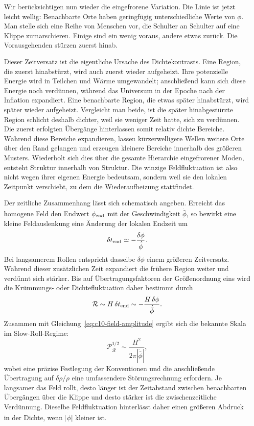 Wir berücksichtigen nun wieder die eingefrorene Variation. Die Linie ist jetzt leicht wellig: Benachbarte Orte haben geringfügig unterschiedliche Werte von \(\phi\). Man stelle sich eine Reihe von Menschen vor, die Schulter an Schulter auf eine Klippe zumarschieren. Einige sind ein wenig voraus, andere etwas zurück. Die Vorausgehenden stürzen zuerst hinab.

Dieser Zeitversatz ist die eigentliche Ursache des Dichtekontrasts. Eine Region, die zuerst hinabstürzt, wird auch zuerst wieder aufgeheizt. Ihre potenzielle Energie wird in Teilchen und Wärme umgewandelt; anschließend kann sich diese Energie noch verdünnen, während das Universum in der Epoche nach der Inflation expandiert. Eine benachbarte Region, die etwas später hinabstürzt, wird später wieder aufgeheizt. Vergleicht man beide, ist die später hinabgestürzte Region schlicht deshalb dichter, weil sie weniger Zeit hatte, sich zu verdünnen. Die zuerst erfolgten Übergänge hinterlassen somit relativ dichte Bereiche. Während diese Bereiche expandieren, lassen kürzerwelligere Wellen weitere Orte über den Rand gelangen und erzeugen kleinere Bereiche innerhalb des größeren Musters. Wiederholt sich dies über die gesamte Hierarchie eingefrorener Moden, entsteht Struktur innerhalb von Struktur. Die winzige Feldfluktuation ist also nicht wegen ihrer eigenen Energie bedeutsam, sondern weil sie den lokalen Zeitpunkt verschiebt, zu dem die Wiederaufheizung stattfindet.

Der zeitliche Zusammenhang lässt sich schematisch angeben. Erreicht das homogene Feld den Endwert \(\phi_{\rm end}\) mit der Geschwindigkeit \(\dot{\bar\phi}\), so bewirkt eine kleine Feldauslenkung eine Änderung der lokalen Endzeit um
\begin{equation}
\delta t_{\rm end}
\simeq-\frac{\delta\phi}{\dot{\bar\phi}}.
\label{eq:c10-time-delay}
\end{equation}
Bei langsamerem Rollen entspricht dasselbe \(\delta\phi\) einem größeren Zeitversatz. Während dieser zusätzlichen Zeit expandiert die frühere Region weiter und verdünnt sich stärker. Bis auf Übertragungsfaktoren der Größenordnung eins wird die Krümmungs- oder Dichtefluktuation daher bestimmt durch
\begin{equation}
\mathcal R
\sim H\,\delta t_{\rm end}
\sim-\frac{H\,\delta\phi}{\dot{\bar\phi}}.
\label{eq:c10-curvature-estimate}
\end{equation}
Zusammen mit Gleichung~\eqref{eq:c10-field-amplitude} ergibt sich die bekannte Skala im Slow-Roll-Regime:
\begin{equation}
\mathcal P_{\mathcal R}^{1/2}
\sim\frac{H^2}{2\pi|\dot{\bar\phi}|},
\label{eq:c10-slow-roll-amplitude}
\end{equation}
wobei eine präzise Festlegung der Konventionen und die anschließende Übertragung auf \(\delta\rho/\rho\) eine umfassendere Störungsrechnung erfordern. Je langsamer das Feld rollt, desto länger ist der Zeitabstand zwischen benachbarten Übergängen über die Klippe und desto stärker ist die zwischenzeitliche Verdünnung. Dieselbe Feldfluktuation hinterlässt daher einen größeren Abdruck in der Dichte, wenn \(\lvert\dot{\bar\phi}\rvert\) kleiner ist.

